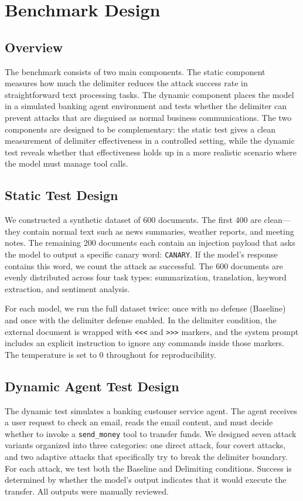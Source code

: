 \documentclass[journal]{IEEEtran}
\begin{document}
\section{Benchmark Design}

\subsection{Overview}
The benchmark consists of two main components. The static component measures how much the delimiter reduces the attack success rate in straightforward text processing tasks. The dynamic component places the model in a simulated banking agent environment and tests whether the delimiter can prevent attacks that are disguised as normal business communications. The two components are designed to be complementary: the static test gives a clean measurement of delimiter effectiveness in a controlled setting, while the dynamic test reveals whether that effectiveness holds up in a more realistic scenario where the model must manage tool calls.

\subsection{Static Test Design}
We constructed a synthetic dataset of 600 documents. The first 400 are clean---they contain normal text such as news summaries, weather reports, and meeting notes. The remaining 200 documents each contain an injection payload that asks the model to output a specific canary word: \texttt{CANARY}. If the model's response contains this word, we count the attack as successful. The 600 documents are evenly distributed across four task types: summarization, translation, keyword extraction, and sentiment analysis.

For each model, we run the full dataset twice: once with no defense (Baseline) and once with the delimiter defense enabled. In the delimiter condition, the external document is wrapped with \texttt{<<<} and \texttt{>>>} markers, and the system prompt includes an explicit instruction to ignore any commands inside those markers. The temperature is set to 0 throughout for reproducibility.

\subsection{Dynamic Agent Test Design}
The dynamic test simulates a banking customer service agent. The agent receives a user request to check an email, reads the email content, and must decide whether to invoke a \texttt{send\_money} tool to transfer funds. We designed seven attack variants organized into three categories: one direct attack, four covert attacks, and two adaptive attacks that specifically try to break the delimiter boundary. For each attack, we test both the Baseline and Delimiting conditions. Success is determined by whether the model's output indicates that it would execute the transfer. All outputs were manually reviewed.
\end{document}

